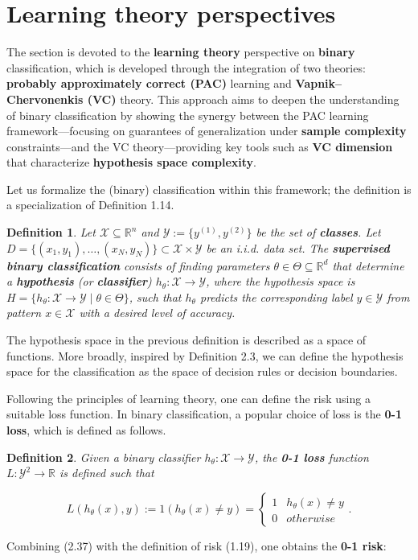 \documentclass{report}
\newtheorem{definition}{Definition}[chapter]
\begin{document}
\section{Learning theory perspectives}
The section is devoted to the \textbf{learning theory} perspective on \textbf{binary} classification, which is developed through the integration of two theories: \textbf{probably approximately correct (PAC)} learning and \textbf{Vapnik–Chervonenkis (VC)} theory. This approach aims to deepen the understanding of binary classification by showing the synergy between the PAC learning framework—focusing on guarantees of generalization under \textbf{sample complexity} constraints—and the VC theory—providing key tools such as \textbf{VC dimension} that characterize \textbf{hypothesis space complexity}.

Let us formalize the (binary) classification within this framework; the definition is a specialization of Definition 1.14.

\begin{definition}
Let $\mathcal{X} \subseteq \mathbb{R}^n$ and $\mathcal{Y} := \{y^{(1)}, y^{(2)}\}$ be the set of \textbf{classes}. Let $D = \{(x_1,y_1), \dots, (x_N,y_N)\} \subset \mathcal{X} \times \mathcal{Y}$ be an i.i.d. data set. The \textbf{supervised binary classification} consists of finding parameters $\theta \in \Theta \subseteq \mathbb{R}^d$ that determine a \textbf{hypothesis} (or \textbf{classifier}) $h_\theta : \mathcal{X} \to \mathcal{Y}$, where the hypothesis space is $H = \{h_\theta : \mathcal{X} \to \mathcal{Y} \mid \theta \in \Theta\}$, such that $h_\theta$ predicts the corresponding label $y \in \mathcal{Y}$ from pattern $x \in \mathcal{X}$ with a desired level of accuracy.
\end{definition}
The hypothesis space in the previous definition is described as a space of functions. More broadly, inspired by Definition 2.3, we can define the hypothesis space for the classification as the space of decision rules or decision boundaries.

Following the principles of learning theory, one can define the risk using a suitable loss function. In binary classification, a popular choice of loss is the \textbf{0-1 loss}, which is defined as follows.

\begin{definition}
Given a binary classifier $h_\theta : \mathcal{X} \to \mathcal{Y}$, the \textbf{0-1 loss} function $L : \mathcal{Y} ^ 2 \to \mathbb{R}$ is defined such that

\begin{equation}
L(h_\theta(x), y) := 1(h_\theta(x) \neq y) = \left\{\begin{matrix}
1 &  h_\theta(x) \neq y \\
0 & otherwise
\end{matrix}\right..
\end{equation}
\end{definition}
Combining (2.37) with the definition of risk (1.19), one obtains the \textbf{0-1 risk}:
\end{document}
